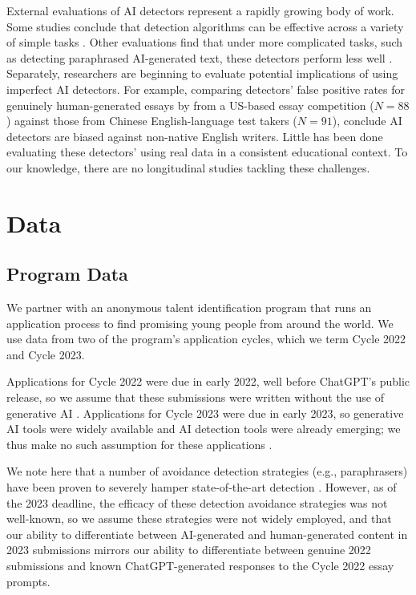 External evaluations of AI detectors represent a rapidly growing body of work. Some studies conclude that detection algorithms can be effective across a variety of simple tasks \cite{mitchell_detectgpt_2023,tharindu_kumarage_stylometric_2023,kalpesh_krishna_paraphrasing_2023}. Other evaluations find that under more complicated tasks, such as detecting paraphrased AI-generated text, these detectors perform less well \cite{kalpesh_krishna_paraphrasing_2023}. Separately, researchers are beginning to evaluate potential implications of using imperfect AI detectors. For example, comparing detectors' false positive rates for genuinely human-generated essays by from a US-based essay competition ($N = 88$) against those from Chinese English-language test takers ($N = 91$), \textcite{liang_gpt_2023} conclude AI detectors are biased against non-native English writers. Little has been done evaluating these detectors' using real data in a consistent educational context. To our knowledge, there are no longitudinal studies tackling these challenges.

\section{Data}\label{sec:experiments}
\subsection{Program Data}\label{ssec:setting}
We partner with an anonymous talent identification program that runs an application process to find promising young people from around the world. We use data from two of the program's application cycles, which we term Cycle 2022 and Cycle 2023.

Applications for Cycle 2022 were due in early 2022, well before ChatGPT's public release, so we assume that these submissions were written without the use of generative AI \cite{openai_gpt-4_2023}. Applications for Cycle 2023 were due in early 2023, so generative AI tools were widely available and AI detection tools were already emerging; we thus make no such assumption for these applications \cite{kirchner_new_2023,gptzero_gptzero_2023,liu_deid-gpt_2023}.

We note here that a number of avoidance detection strategies (e.g., paraphrasers) have been proven to severely hamper state-of-the-art detection  \cite{kalpesh_krishna_paraphrasing_2023}. However, as of the 2023 deadline, the efficacy of these detection avoidance strategies was not well-known, so we assume these strategies were not widely employed, and that our ability to differentiate between AI-generated and human-generated content in 2023 submissions mirrors our ability to differentiate between genuine 2022 submissions and known ChatGPT-generated responses to the Cycle 2022 essay prompts.

